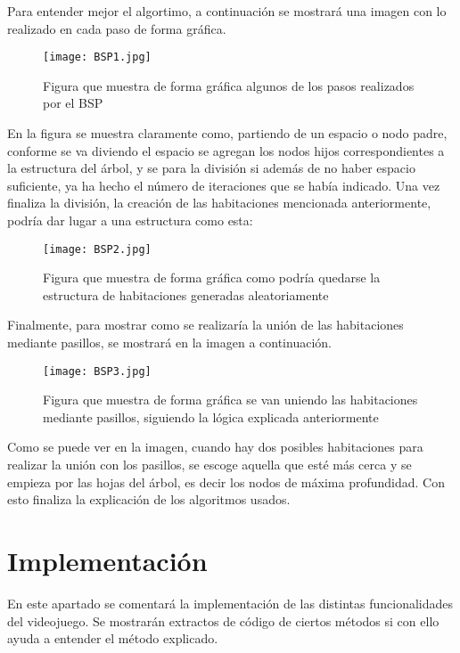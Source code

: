 Para entender mejor el algortimo, a continuación se mostrará una imagen con lo realizado en cada paso de forma gráfica.

\begin{figure}[H]
    \centering
    \texttt{[image: BSP1.jpg]}
    \caption{Figura que muestra de forma gráfica algunos de los pasos realizados por el BSP}
\end{figure}

En la figura se muestra claramente como, partiendo de un espacio o nodo padre, conforme se va diviendo el espacio se agregan los nodos hijos correspondientes a la estructura del árbol, y se para la división si además de no haber espacio suficiente, ya ha hecho el número de iteraciones que se había indicado. Una vez finaliza la división, la creación de las habitaciones mencionada anteriormente, podría dar lugar a una estructura como esta:

\begin{figure}[H]
    \centering
    \texttt{[image: BSP2.jpg]}
    \caption{Figura que muestra de forma gráfica como podría quedarse la estructura de habitaciones generadas aleatoriamente}
\end{figure}

Finalmente, para mostrar como se realizaría la unión de las habitaciones mediante pasillos, se mostrará en la imagen a continuación.

\begin{figure}[H]
    \centering
    \texttt{[image: BSP3.jpg]}
    \caption{Figura que muestra de forma gráfica se van uniendo las habitaciones mediante pasillos, siguiendo la lógica explicada anteriormente}
\end{figure}

Como se puede ver en la imagen, cuando hay dos posibles habitaciones para realizar la unión con los pasillos, se escoge aquella que esté más cerca y se empieza por las hojas del árbol, es decir los nodos de máxima profundidad. Con esto finaliza la explicación de los algoritmos usados.

\section{Implementación}
\label{sec:implementacion}

En este apartado se comentará la implementación  de las distintas funcionalidades del videojuego. Se mostrarán extractos de código de ciertos métodos si con ello ayuda a entender el método explicado.

